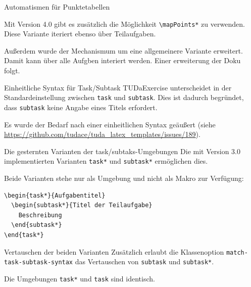 \documentclass[
	ngerman,%
	accentcolor=9c,%
	points=true, für die Aktivierung der Punktereferenzen
]{tudaexercise}
\newcommand*{\code}[1]{\texttt{#1}}
\begin{document}
\begin{task}[points=auto]{Automatismen für Punktetabellen}
\begin{subtask}[points=3,title={Automatische Punktetabellen}]
	\end{subtask}

	\begin{subtask}[points=5,title={Detaillierte Punktetabellen inklusive Teilaufgaben}]
		Mit Version 4.0 gibt es zusätzlich die Möglichkeit \verb+\mapPoints*+ zu verwenden.
		Diese Variante iteriert ebenso über Teilaufgaben.

		Außerdem wurde der Mechanismum um eine allgemeinere Variante erweitert.
		Damit kann über alle Aufgben interiert werden.
		Einer erweiterung der Doku folgt.
	\end{subtask}
\end{task}

\begin{task*}{Einheitliche Syntax für Task/Subtask}
	\label{task-subtask-syntax}
	TUDaExercise unterscheidet in der Standardeinstellung zwischen \code{task} und \code{subtask}. Dies ist dadurch begründet, dass \code{subtask} keine Angabe eines Titels erfordert.

	Es wurde der Bedarf nach einer einheitlichen Syntax geäußert (siehe \url{https://github.com/tudace/tuda_latex_templates/issues/189}).

	\begin{subtask*}{Die gesternten Varianten der task/subtaks-Umgebungen}
		Die mit Version 3.0 implementierten Varianten \code{task*} und \code{subtask*} ermöglichen dies.

		Beide Varianten stehe nur als Umgebung und nicht als Makro zur Verfügung:

\begin{verbatim}
\begin{task*}{Aufgabentitel}
  \begin{subtask*}{Titel der Teilaufgabe}
    Beschreibung
  \end{subtask*}
\end{task*}
\end{verbatim}
	\end{subtask*}

	\begin{subtask*}{Vertauschen der beiden Varianten}
		Zusätzlich erlaubt die Klassenoption \code{match-task-subtask-syntax} das Vertauschen von \code{subtask} und \code{subtask*}.

		Die Umgebungen \code{task*} und \code{task} sind identisch.
	\end{subtask*}
\end{task*}
\end{document}
